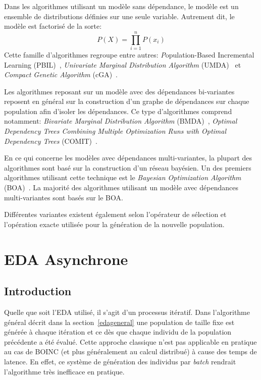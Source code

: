 \documentclass[a4paper, 11pt]{report}
\begin{document}
Dans les algorithmes utilisant un modèle sans dépendance, le modèle est un ensemble de distributions définies sur une seule variable. Autrement dit, le modèle est factorisé de la sorte:
$$ P(X) = \prod_{i=1}^{n} P(x_i)$$
Cette famille d'algorithmes regroupe entre autres: \textit{P}opulation-{B}ased {I}ncremental {L}earning (PBIL)~\cite{PBIL}, \textit{Univariate Marginal Distribution Algorithm} (UMDA)~\cite{CLEVER_ALGO} et \textit{Compact Genetic Algorithm} (cGA)~\cite{CGA}. %

Les algorithmes reposant sur un modèle avec des dépendances bi-variantes reposent en général sur la construction d'un graphe de dépendances sur chaque population afin d'isoler les dépendances. Ce type d'algorithmes comprend notamment: \textit{Bivariate Marginal Distribution Algorithm} (BMDA)~\cite{BMDA}, \textit{Optimal Dependency Trees Combining Multiple Optimization Runs with Optimal Dependency Trees} (COMIT)~\cite{COMIT}.

En ce qui concerne les modèles avec dépendances multi-variantes, la plupart des algorithmes sont basé sur la construction d'un réseau bayésien. Un des premiers algorithmes utilisant cette technique est le \textit{Bayesian Optimization Algorithm} (BOA)~\cite{BOA}. La majorité des algorithmes utilisant un modèle avec dépendances multi-variantes sont basés sur le BOA.

Différentes variantes existent également selon l'opérateur de sélection et l'opération exacte utilisée pour la génération de la nouvelle population.

\section{EDA Asynchrone}
\label{edaasynch}
\subsection{Introduction}
Quelle que soit l'EDA utilisé, il s'agit d'un processus itératif. Dans l'algorithme général décrit dans la section~\ref{edageneral} une population de taille fixe est générée à chaque itération et ce dès que chaque individu de la population précédente a été évalué. Cette approche classique n'est pas applicable en pratique au cas de \textsc{BOINC} (et plus généralement au calcul distribué) à cause des temps de latence. En effet, ce système de génération des individus par \textit{batch} rendrait l'algorithme très inefficace en pratique.
\end{document}
